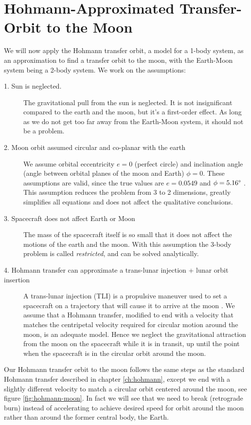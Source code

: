 \section{Hohmann-Approximated Transfer-Orbit to the Moon} \label{ch:hohmann-moon}
We will now apply the Hohmann transfer orbit, a model for a 1-body system, as an approximation to find a transfer orbit to the moon, with the Earth-Moon system being a 2-body system. We work on the assumptions:
\begin{description}
    \item[1. Sun is neglected.] The gravitational pull from the sun is neglected. It is not insignificant compared to the earth and the moon, but it's a first-order effect. As long as we do not get too far away from the Earth-Moon system, it should not be a problem.
    \item[2. Moon orbit assumed circular and co-planar with the earth] We assume orbital eccentricity $e = 0$ (perfect circle) and inclination angle (angle between orbital planes of the moon and Earth) $\phi = 0$. These assumptions are valid, since the true values are $e = 0.0549$ and $\phi = 5.16 \degree$ \cite{ma}. This assumption reduces the problem from 3 to 2 dimensions, greatly simplifies all equations and does not affect the qualitative conclusions.
    \item[3. Spacecraft does not affect Earth or Moon] The mass of the spacecraft itself is so small that it does not affect the motions of the earth and the moon. With this assumption the 3-body problem is called \emph{restricted}, and can be solved analytically.
    \item[4. Hohmann transfer can approximate a trans-lunar injection + lunar orbit insertion] A trans-lunar injection (TLI) is a propulsive maneuver used to set a spacecraft on a trajectory that will cause it to arrive at the moon \cite{NASA1966}. We assume that a Hohmann transfer, modified to end with a velocity that matches the centripetal velocity required for circular motion around the moon, is an adequate model. Hence we neglect the gravitational attraction from the moon on the spacecraft while it is in transit, up until the point when the spacecraft is in the circular orbit around the moon.
\end{description}

Our Hohmann transfer orbit to the moon follows the same steps as the standard Hohmann transfer described in chapter \ref{ch:hohmann}, except we end with a slightly different velocity to match a circular orbit centered around the moon, see figure \ref{fig:hohmann-moon}. In fact we will see that we need to break (retrograde burn) instead of accelerating to achieve desired speed for orbit around the moon rather than around the former central body, the Earth.

